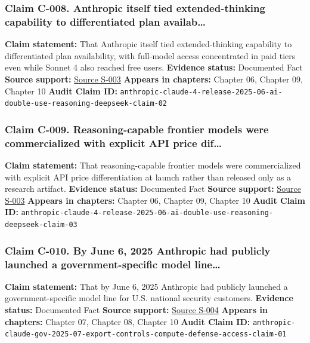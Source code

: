 \documentclass[
  american,
  11pt,
  letterpaper,
]{article}
\begin{document}
\subsubsection{Claim C-008. Anthropic itself tied extended-thinking
capability to differentiated plan
availab\ldots{}}\label{claim-c-008-anthropic-itself-tied-extended-thinking-capability-to-differentiated-plan-availab}

\textbf{Claim statement:} That Anthropic itself tied extended-thinking
capability to differentiated plan availability, with full-model access
concentrated in paid tiers even while Sonnet 4 also reached free users.
\textbf{Evidence status:} Documented Fact \textbf{Source support:}
\hyperref[source-s-003-introducing-claude-4]{Source S-003}
\textbf{Appears in chapters:} Chapter 06, Chapter 09, Chapter 10
\textbf{Audit Claim ID:}
\texttt{anthropic-claude-4-release-2025-06-ai-double-use-reasoning-deepseek-claim-02}

\subsubsection{Claim C-009. Reasoning-capable frontier models were
commercialized with explicit API price
dif\ldots{}}\label{claim-c-009-reasoning-capable-frontier-models-were-commercialized-with-explicit-api-price-dif}

\textbf{Claim statement:} That reasoning-capable frontier models were
commercialized with explicit API price differentiation at launch rather
than released only as a research artifact. \textbf{Evidence status:}
Documented Fact \textbf{Source support:}
\hyperref[source-s-003-introducing-claude-4]{Source S-003}
\textbf{Appears in chapters:} Chapter 06, Chapter 09, Chapter 10
\textbf{Audit Claim ID:}
\texttt{anthropic-claude-4-release-2025-06-ai-double-use-reasoning-deepseek-claim-03}

\subsubsection{Claim C-010. By June 6, 2025 Anthropic had publicly
launched a government-specific model
line\ldots{}}\label{claim-c-010-by-june-6-2025-anthropic-had-publicly-launched-a-government-specific-model-line}

\textbf{Claim statement:} That by June 6, 2025 Anthropic had publicly
launched a government-specific model line for U.S. national security
customers. \textbf{Evidence status:} Documented Fact \textbf{Source
support:}
\hyperref[source-s-004-claude-gov-models-for-u-s-national-security-customers]{Source
S-004} \textbf{Appears in chapters:} Chapter 07, Chapter 08, Chapter 10
\textbf{Audit Claim ID:}
\texttt{anthropic-claude-gov-2025-07-export-controls-compute-defense-access-claim-01}
\end{document}
